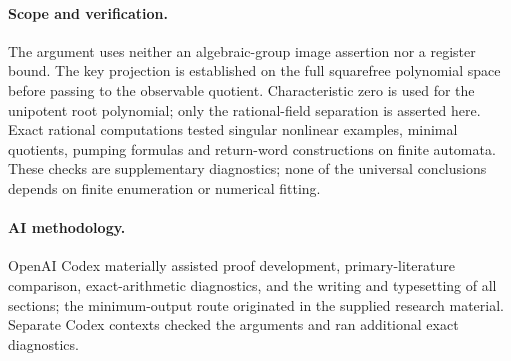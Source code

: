 \documentclass[acmlarge,screen,11pt,nonacm]{acmart}
\theoremstyle{definition}
\begin{document}
\paragraph{Scope and verification.}
The argument uses neither an algebraic-group image assertion nor a register bound. The key projection is established on the full squarefree polynomial space before passing to the observable quotient. Characteristic zero is used for the unipotent root polynomial; only the rational-field separation is asserted here. Exact rational computations tested singular nonlinear examples, minimal quotients, pumping formulas and return-word constructions on finite automata. These checks are supplementary diagnostics; none of the universal conclusions depends on finite enumeration or numerical fitting.

\paragraph{AI methodology.}
OpenAI Codex materially assisted proof development, primary-literature comparison, exact-arithmetic diagnostics, and the writing and typesetting of all sections; the minimum-output route originated in the supplied research material. Separate Codex contexts checked the arguments and ran additional exact diagnostics.

\clearpage
\renewcommand{\bibfont}{\normalfont\normalsize}


\end{document}
